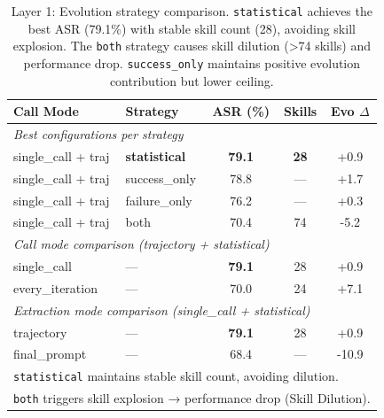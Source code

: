 \begin{table}[t]
\centering
\caption{Layer 1: Evolution strategy comparison. \texttt{statistical} achieves the best ASR (79.1\%) with stable skill count (28), avoiding skill explosion. The \texttt{both} strategy causes skill dilution (>74 skills) and performance drop. \texttt{success\_only} maintains positive evolution contribution but lower ceiling.}
\label{tab:layer1}
\small
\begin{tabular}{llccc}
\toprule
\textbf{Call Mode} & \textbf{Strategy} & \textbf{ASR (\%)} & \textbf{Skills} & \textbf{Evo $\Delta$} \\
\midrule
\multicolumn{5}{l}{\textit{Best configurations per strategy}} \\
single\_call + traj & \textbf{statistical} & \textbf{79.1} & \textbf{28} & +0.9 \\
single\_call + traj & success\_only & 78.8 & — & +1.7 \\
single\_call + traj & failure\_only & 76.2 & — & +0.3 \\
single\_call + traj & both & 70.4 & 74 & -5.2 \\
\midrule
\multicolumn{5}{l}{\textit{Call mode comparison (trajectory + statistical)}} \\
single\_call & — & \textbf{79.1} & 28 & +0.9 \\
every\_iteration & — & 70.0 & 24 & +7.1 \\
\midrule
\multicolumn{5}{l}{\textit{Extraction mode comparison (single\_call + statistical)}} \\
trajectory & — & \textbf{79.1} & 28 & +0.9 \\
final\_prompt & — & 68.4 & — & -10.9 \\
\bottomrule
\multicolumn{5}{l}{\small \texttt{statistical} maintains stable skill count, avoiding dilution.} \\
\multicolumn{5}{l}{\small \texttt{both} triggers skill explosion → performance drop (Skill Dilution).} \\
\end{tabular}
\end{table}